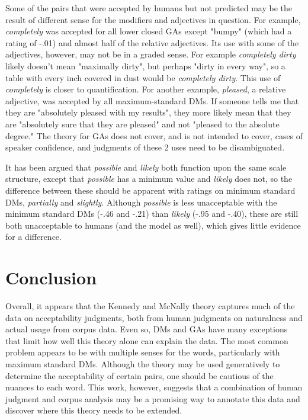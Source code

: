 \documentclass[11pt]{article}
\begin{document}
Some of the pairs that were accepted by humans but not predicted may be the result of different sense for the modifiers and adjectives in question. For example, \textit{completely} was accepted for all lower closed GAs except "bumpy" (which had a rating of -.01) and almost half of the relative adjectives. Its use with some of the adjectives, however, may not be in a graded sense. For example \textit{completely dirty} likely doesn't mean "maximally dirty", but perhaps "dirty in every way", so a table with every inch covered in dust would be \textit{completely dirty}. This use of \textit{completely} is closer to quantification. For another example, \textit{pleased}, a relative adjective, was accepted by all maximum-standard DMs. If someone tells me that they are "absolutely pleased with my results", they more likely mean that they are "absolutely sure that they are pleased" and not "pleased to the absolute degree." The theory for GAs does not cover, and is not intended to cover, cases of speaker confidence, and judgments of these 2 uses need to be disambiguated.

It has been argued that \textit{possible} and \textit{likely} both function upon the same scale structure, except that \textit{possible} has a minimum value and \textit{likely} does not, so the difference between these should be apparent with ratings on minimum standard DMs, \textit{partially} and \textit{slightly}. Although \textit{possible} is less unacceptable with the minimum standard DMs (-.46 and -.21) than \textit{likely} (-.95 and -.40), these are still both unacceptable to humans (and the model as well), which gives little evidence for a difference.

\section{Conclusion}

Overall, it appears that the Kennedy and McNally theory captures much of the data on acceptability judgments, both from human judgments on naturalness and actual usage from corpus data. Even so, DMs and GAs have many exceptions that limit how well this theory alone can explain the data. The most common problem appears to be with multiple senses for the words, particularly with maximum standard DMs. Although the theory may be used generatively to determine the acceptability of certain pairs, one should be cautious of the nuances to each word. This work, however, suggests that a combination of human judgment and corpus analysis may be a promising way to annotate this data and discover where this theory needs to be extended.
\end{document}

